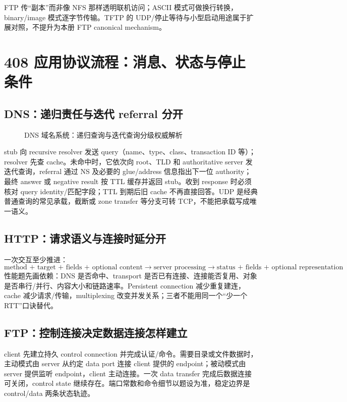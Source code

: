 \documentclass[UTF8,fontset=none,11pt,a4paper]{ctexart}
\begin{document}
FTP 传“副本”而非像 NFS 那样透明联机访问；ASCII 模式可做换行转换，binary/image 模式逐字节传输。TFTP 的 UDP/停止等待与小型启动用途属于扩展对照，不提升为本册 FTP canonical mechanism。

\section{408 应用协议流程：消息、状态与停止条件}

\subsection{DNS：递归责任与迭代 referral 分开}

\begin{figure}[htbp]
  \centering
  \resizebox{0.96\linewidth}{!}{}
  \caption{DNS 域名系统：递归查询与迭代查询分级权威解析}
  \label{fig:dns-query-modes}
\end{figure}


stub 向 recursive resolver 发送 query（name、type、class、transaction ID 等）；resolver 先查 cache。未命中时，它依次向 root、TLD 和 authoritative server 发迭代查询，referral 通过 NS 及必要的 glue/address 信息指出下一位 authority；最终 answer 或 negative result 按 TTL 缓存并返回 stub。收到 response 时必须核对 query identity/匹配字段；TTL 到期后旧 cache 不再直接回答。UDP 是经典普通查询的常见承载，截断或 zone transfer 等分支可转 TCP，不能把承载写成唯一语义。

\subsection{HTTP：请求语义与连接时延分开}

一次交互至少推进：
\[
\boxed{\text{method + target + fields + optional content}
\to\text{server processing}
\to\text{status + fields + optional representation}}.
\]
性能题先画依赖：DNS 是否命中、transport 是否已有连接、连接能否复用、对象是否串行/并行、内容大小和链路速率。Persistent connection 减少重复建连，cache 减少请求/传输，multiplexing 改变并发关系；三者不能用同一个“少一个 RTT”口诀替代。

\subsection{FTP：控制连接决定数据连接怎样建立}

client 先建立持久 control connection 并完成认证/命令。需要目录或文件数据时，主动模式由 server 从约定 data port 连接 client 提供的 endpoint；被动模式由 server 提供监听 endpoint，client 主动连接。一次 data transfer 完成后数据连接可关闭，control state 继续存在。端口常数和命令细节以题设为准，稳定边界是 control/data 两条状态轨迹。
\end{document}
